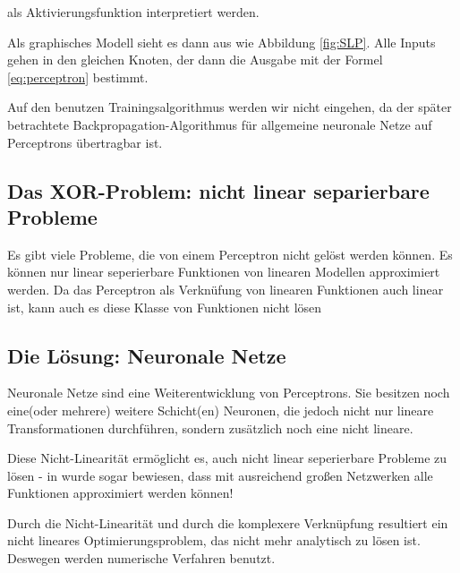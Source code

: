 als Aktivierungsfunktion interpretiert werden.

Als graphisches Modell sieht es dann aus wie Abbildung \ref{fig:SLP}. Alle Inputs gehen in den gleichen Knoten, der dann die Ausgabe mit der Formel \ref{eq:perceptron} bestimmt. 

Auf den benutzen Trainingsalgorithmus werden wir nicht eingehen, da der später betrachtete Backpropagation-Algorithmus für allgemeine neuronale Netze auf Perceptrons übertragbar ist.

\subsection{Das XOR-Problem: nicht linear separierbare Probleme}
Es gibt viele Probleme, die von einem Perceptron nicht gelöst werden können. Es können nur linear seperierbare Funktionen von linearen Modellen approximiert werden. Da das Perceptron als Verknüfung von linearen Funktionen auch linear ist, kann auch es diese Klasse von Funktionen nicht lösen

\subsection{Die Lösung: Neuronale Netze}
Neuronale Netze sind eine Weiterentwicklung von Perceptrons. Sie besitzen noch eine(oder mehrere) weitere Schicht(en) Neuronen, die jedoch nicht nur lineare Transformationen durchführen, sondern zusätzlich noch eine nicht lineare.

Diese Nicht-Linearität ermöglicht es, auch nicht linear seperierbare Probleme zu lösen - in \cite{cybenko1989approximation} wurde sogar bewiesen, dass mit ausreichend großen Netzwerken alle Funktionen approximiert werden können!

Durch die Nicht-Linearität und durch die komplexere Verknüpfung resultiert ein nicht lineares Optimierungsproblem, das nicht mehr analytisch zu lösen ist. Deswegen werden numerische Verfahren benutzt.


